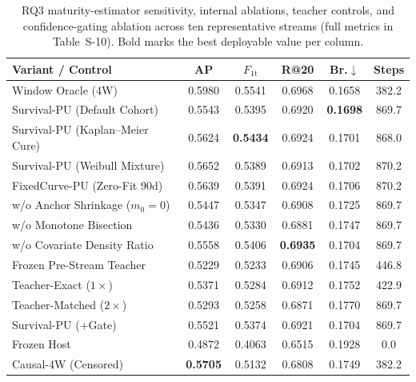 \documentclass[pdflatex,sn-basic]{sn-jnl}
\theoremstyle{definition}
\theoremstyle{plain}
\begin{document}
\begin{table}[t]
\centering
\caption{RQ3 maturity-estimator sensitivity, internal ablations, teacher controls, and confidence-gating ablation across ten representative streams (full metrics in Table~S-10). Bold marks the best deployable value per column.}
\label{tab:rq3_ablations}
\fontsize{7.5}{9.0}\selectfont
\setlength{\tabcolsep}{2.0pt}
\begin{tabular*}{\textwidth}{@{\extracolsep\fill}lccccc@{}}
\toprule
\textbf{Variant / Control} & \textbf{AP} & \textbf{$F_{1\mathrm{t}}$} & \textbf{R@20} & \textbf{Br.$\downarrow$} & \textbf{Steps} \\
\midrule
Window Oracle (4W) & 0.5980 & 0.5541 & 0.6968 & 0.1658 & 382.2 \\
\midrule
Survival-PU (Default Cohort) & 0.5543 & 0.5395 & 0.6920 & \textbf{0.1698} & 869.7 \\
Survival-PU (Kaplan--Meier Cure) & 0.5624 & \textbf{0.5434} & 0.6924 & 0.1701 & 868.0 \\
Survival-PU (Weibull Mixture) & 0.5652 & 0.5389 & 0.6913 & 0.1702 & 870.2 \\
FixedCurve-PU (Zero-Fit 90d) & 0.5639 & 0.5391 & 0.6924 & 0.1706 & 870.2 \\
\midrule
w/o Anchor Shrinkage ($m_0=0$) & 0.5447 & 0.5347 & 0.6908 & 0.1725 & 869.7 \\
w/o Monotone Bisection & 0.5436 & 0.5330 & 0.6881 & 0.1747 & 869.7 \\
w/o Covariate Density Ratio & 0.5558 & 0.5406 & \textbf{0.6935} & 0.1704 & 869.7 \\
Frozen Pre-Stream Teacher & 0.5229 & 0.5233 & 0.6906 & 0.1745 & 446.8 \\
\midrule
Teacher-Exact ($1\times$) & 0.5371 & 0.5284 & 0.6912 & 0.1752 & 422.9 \\
Teacher-Matched ($2\times$) & 0.5293 & 0.5258 & 0.6871 & 0.1770 & 869.7 \\
Survival-PU (+Gate) & 0.5521 & 0.5374 & 0.6921 & 0.1704 & 869.7 \\
\midrule
Frozen Host & 0.4872 & 0.4063 & 0.6515 & 0.1928 & 0.0 \\
Causal-4W (Censored) & \textbf{0.5705} & 0.5132 & 0.6808 & 0.1749 & 382.2 \\
\bottomrule
\end{tabular*}
\vspace{2pt}\par{}
\end{table}
\end{document}
